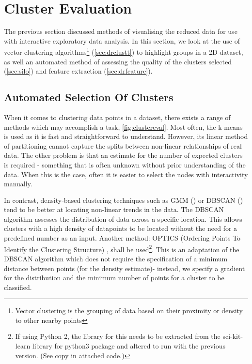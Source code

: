 \section{Cluster Evaluation}
The previous section discussed methods of visualising the reduced data for use with interactive exploratory data analysis. In this section, we look at the use of vector clustering algorithms\footnote{Vector clustering is the grouping of data based on their proximity or density to other nearby points} (\autoref{sec:drclustt}) to highlight groups in a 2D dataset, as well an automated method of assessing the quality of the clusters selected (\autoref{sec:silo}) and feature extraction (\autoref{sec:drfeature}).



\subsection{Automated Selection Of Clusters}\label{sec:drclustt}
    When it comes to clustering data points in a dataset, there exists a range of methods which may accomplish a task, \autoref{fig:clustereval}. Most often, the k-means \citep{kmeans} is used as it is fast and straightforward to understand. However, its linear method of partitioning cannot capture the splits between non-linear relationships of real data. The other problem is that an estimate for the number of expected clusters is required - something that is often unknown without prior understanding of the data. When this is the case, often it is easier to select the nodes with interactivity manually.

In contrast, density-based clustering techniques such as GMM (\citep{scikit}) or DBSCAN (\citep{DBSCAN}) tend to be better at locating non-linear trends in the data. The DBSCAN algorithm assesses the distribution of data across a specific location. This allows clusters with a high density of datapoints to be located without the need for a predefined number as an input. Another method: OPTICS (Ordering Points To Identify the Clustering Structure) \citep{optics}, shall be used\footnote{ If using Python 2, the library for this needs to be extracted from the sci-kit-learn library for python3 package and altered to run with the previous version. (See copy in attached code.)}. This is an adaptation of the DBSCAN algorithm which does not require the specification of a minimum distance between points (for the density estimate)- instead, we specify a gradient for the distribution and the minimum number of points for a cluster to be classified.


